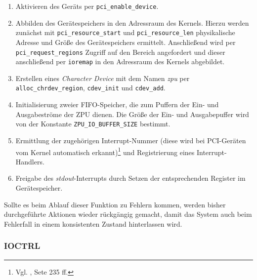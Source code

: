 \documentclass[11pt]{scrartcl}
\begin{document}
\begin{enumerate}
	\item Aktivieren des Geräts per \texttt{pci\_enable\_device}.
	\item Abbilden des Gerätespeichers in den Adressraum des Kernels. Hierzu werden zunächst mit \texttt{pci\_resource\_start} und \texttt{pci\_resource\_len} physikalische Adresse und Größe des Gerätespeichers ermittelt. Anschließend wird per \texttt{pci\_request\_regions} Zugriff auf den Bereich angefordert und dieser anschließend per \texttt{ioremap} in den Adressraum des Kernels abgebildet.
	\item Erstellen eines \textit{Character Device} mit dem Namen \textit{zpu} per \texttt{alloc\_chrdev\_region}, \texttt{cdev\_init} und \texttt{cdev\_add}.
	\item Initialisierung zweier FIFO-Speicher, die zum Puffern der Ein- und Ausgabeströme der ZPU dienen. Die Größe der Ein- und Ausgabepuffer wird von der Konstante \texttt{ZPU\_IO\_BUFFER\_SIZE} bestimmt.
	\item Ermittlung der zugehörigen Interrupt-Nummer (diese wird bei PCI-Geräten vom Kernel automatisch erkannt)\footnote{Vgl. \cite{script_hwstp}, Sete 235 ff.} und Registrierung eines Interrupt-Handlers.
	\item Freigabe des \textit{stdout}-Interrupts durch Setzen der entsprechenden Register im Gerätespeicher.
\end{enumerate}

Sollte es beim Ablauf dieser Funktion zu Fehlern kommen, werden bisher durchgeführte Aktionen wieder rückgängig gemacht, damit das System auch beim Fehlerfall in einem konsistenten Zustand hinterlassen wird.

\subsubsection{IOCTRL}


%	
%	
%	
%	
%		
%		
%	
%	
\end{document}

